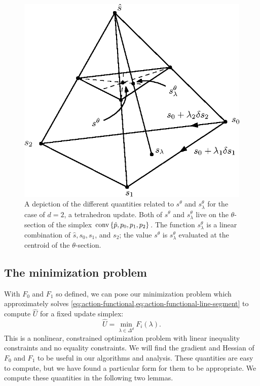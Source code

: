 \documentclass[sisc-eikonal.tex]{subfiles}
\begin{document}
\begin{figure}[t]
  \centering
  \includegraphics{slowness-tetra.eps}
  \caption{A depiction of the different quantities related to
    $s^{\theta}$ and $s^{\theta}_\lambda$ for the case of $d = 2$, a
    tetrahedron update. Both of $s^\theta$ and $s^\theta_\lambda$ live
    on the $\theta$-section of the simplex
    $\operatorname{conv} \left\{\hat{p}, p_0, p_1, p_2\right\}$. The function
    $s^\theta_\lambda$ is a linear combination of $\hat{s}, s_0, s_1$,
    and $s_2$; the value $s^\theta$ is $s^\theta_\lambda$ evaluated at
    the centroid of the $\theta$-section.}
\end{figure}

\subsection{The minimization problem}

With $F_0$ and $F_1$ so defined, we can pose our minimization problem
which approximately solves
\cref{eq:action-functional,eq:action-functional-line-segment} to
compute $\hat{U}$ for a fixed update simplex:
\begin{equation}
  \label{eq:constrained-minimization}
  \hat{U} = \min_{\lambda \in \Delta^d} F_i(\lambda).
\end{equation}
This is a nonlinear, constrained optimization problem with linear
inequality constraints and no equality constraints. We will find the
gradient and Hessian of $F_0$ and $F_1$ to be useful in our algorithms
and analysis. These quantities are easy to compute, but we have found
a particular form for them to be appropriate. We compute these
quantities in the following two lemmas.
\end{document}

